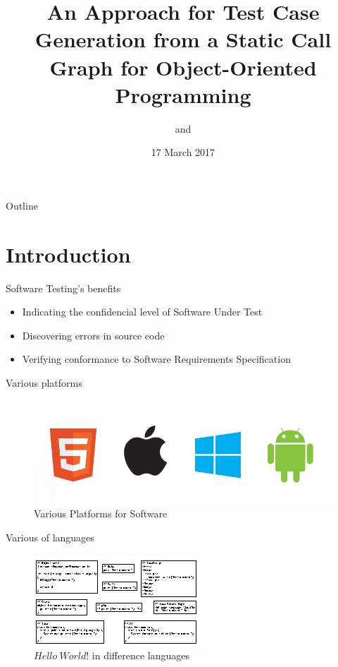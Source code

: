\documentclass{beamer}
\title{An Approach for Test Case Generation from a Static Call Graph for Object-Oriented Programming}
\date{17 March 2017}
\author{\authorNameEN~\small{and~\advisorEn}}
\institute{{\facultyEn}, {\universityEn}}
\begin{document}
\maketitle

\begin{frame}[t]{Outline}
    \tableofcontents[hideallsubsections]
\end{frame}

\newcommand{\displayframe}{%
    \begin{frame}{Outline}
    \tableofcontents[%
        currentsection,
        subsectionstyle=hide
        ]
    \end{frame}
}
%
\section{Introduction}
\begin{frame}{Software Testing's benefits}
  \begin{itemize}
     \item Indicating the confidencial level of Software Under Test
     \item Discovering errors in source code
     \item Verifying conformance to Software Requirements Specification
  \end{itemize}
\end{frame}

\begin{frame}{Various platforms}
    \begin{figure}
        \includegraphics[width=.8\paperwidth]{figure/mobile_bugs}
        \caption{Various Platforms for Software}
        \label{fig:variousplatform}
    \end{figure}
\end{frame}

\begin{frame}{Various of languages}
    \begin{figure}
        \includegraphics[width=.9\paperwidth]{figure/hello-world-lang}
        \caption{$Hello~World!$ in difference languages}
        \label{fig:helloworld}
    \end{figure}
\end{frame}
\end{document}
